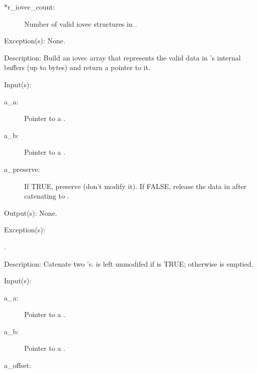\begin{capi}
\begin{capilist}
\begin{description}
		\item[*r\_iovec\_count: ]
			Number of valid iovec structures in .
		\end{description}
	\item[Exception(s): ] None.
	\item[Description: ]
		Build an iovec array that represents the valid data in
		's internal buffers (up to 
		bytes) and return a pointer to it.
	\end{capilist}
\label{buf_catenate}
	\begin{capilist}
	\item[Input(s): ]
		\begin{description}\item[]
		\item[a\_a: ]
			Pointer to a .
		\item[a\_b: ]
			Pointer to a .
		\item[a\_preserve: ]
			If TRUE, preserve  (don't modify it).  If
			FALSE, release the data in  after catenating
			 to .
		\end{description}
	\item[Output(s): ] None.
	\item[Exception(s): ]
		\begin{description}\item[]
		\item[.]
		\end{description}
	\item[Description: ]
		Catenate two 's.   is left unmodifed
		if  is TRUE; otherwise  is emptied.
	\end{capilist}
\label{buf_split}
	\begin{capilist}
	\item[Input(s): ]
		\begin{description}\item[]
		\item[a\_a: ]
			Pointer to a \classname{buf}.
		\item[a\_b: ]
			Pointer to a \classname{buf}.
		\item[a\_offset: ]

\end{description}
\end{capilist}
\end{capi}
